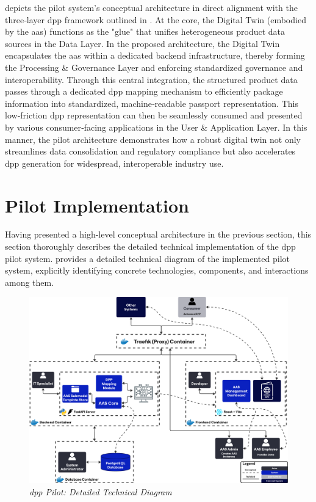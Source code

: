  depicts the pilot system’s conceptual architecture in direct alignment with the three‐layer \ac{dpp} framework outlined in . At the core, the Digital Twin (embodied by the \ac{aas}) functions as the "glue" that unifies heterogeneous product data sources in the Data Layer. In the proposed architecture, the Digital Twin encapsulates the \ac{aas} within a dedicated backend infrastructure, thereby forming the Processing \& Governance Layer and enforcing standardized governance and interoperability. Through this central integration, the structured product data passes through a dedicated \ac{dpp} mapping mechanism to efficiently package information into standardized, machine‐readable passport representation. This low‐friction \ac{dpp} representation can then be seamlessly consumed and presented by various consumer‐facing applications in the User \& Application Layer. In this manner, the pilot architecture demonstrates how a robust digital twin not only streamlines data consolidation and regulatory compliance but also accelerates \ac{dpp} generation for widespread, interoperable industry use.

\section{Pilot Implementation}
\label{sec:pilot_implementation}

Having presented a high-level conceptual architecture in the previous section, this section thoroughly describes the detailed technical implementation of the \ac{dpp} pilot system.  provides a detailed technical diagram of the implemented pilot system, explicitly identifying concrete technologies, components, and interactions among them.

\begin{figure}[htbp]
  \centering
  \includegraphics[width=\textwidth]{figures/pilot_architecture_technical.pdf}
  \caption{%
    \textit{\ac{dpp} Pilot: Detailed Technical Diagram} 
  }
  \label{fig:pilot_architecture_technical}
\end{figure}

